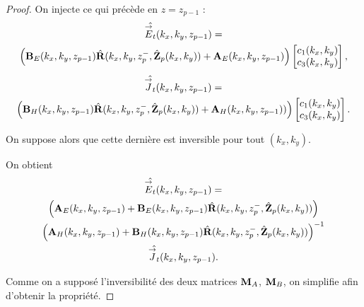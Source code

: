 \begin{proof}
      On injecte ce qui précède en \(z = z_{p-1}\) :
      \begin{multline*}
        \hat{{\overset{\rightarrow}{E}}_t}(k_x,k_y,z_{p-1}) = 
        \\
        \left(\mathbf{B}_{E}(k_x,k_y,z_{p-1})\hat{\mathbf{R}}(k_x,k_y,z_p^-,\hat{\mathbf{Z}}_p(k_x,k_y)) + \mathbf{A}_{E}(k_x,k_y,z_{p-1})\right)
        \begin{bmatrix}
          c_1(k_x,k_y) \\
          c_3(k_x,k_y)
        \end{bmatrix},
      \end{multline*}        
      \begin{multline*}
        \hat{{\overset{\rightarrow}{J}}_t}(k_x,k_y,z_{p-1}) =
        \\
        \left(\mathbf{B}_{H}(k_x,k_y,z_{p-1})\hat{\mathbf{R}}(k_x,k_y,z_p^-,\hat{\mathbf{Z}}_p(k_x,k_y)) + \mathbf{A}_{H}(k_x,k_y,z_{p-1}))\right)
        \begin{bmatrix}
          c_1(k_x,k_y) \\
          c_3(k_x,k_y)
        \end{bmatrix}.
      \end{multline*}

      On suppose alors que cette dernière est inversible pour tout \((k_x,k_y)\).

      On obtient
      \begin{multline*}
        \hat{{\overset{\rightarrow}{E}}_t}(k_x,k_y,z_{p-1}) =
        \\
        \left(\mathbf{A}_{E}(k_x,k_y,z_{p-1}) + \mathbf{B}_{E}(k_x,k_y,z_{p-1})\hat{\mathbf{R}}(k_x,k_y,z_p^-,\hat{\mathbf{Z}}_p(k_x,k_y))\right) \\
        \left(\mathbf{A}_{H}(k_x,k_y,z_{p-1}) + \mathbf{B}_{H}(k_x,k_y,z_{p-1})\hat{\mathbf{R}}(k_x,k_y,z_p^-,\hat{\mathbf{Z}}_p(k_x,k_y))\right)^{-1}
        \\
        \hat{{\overset{\rightarrow}{J}}_t}(k_x,k_y,z_{p-1}).
      \end{multline*}

      Comme on a supposé l'inversibilité des deux matrices \(\mathbf{M}_{A}\), \(\mathbf{M}_{B}\), on simplifie afin d'obtenir la propriété.
    \end{proof}

